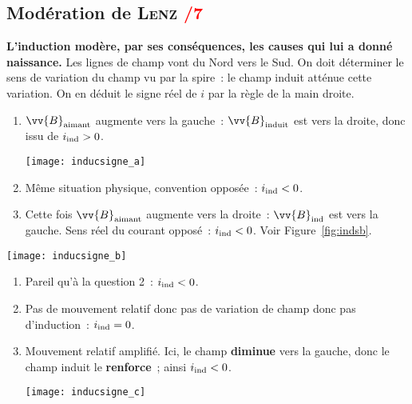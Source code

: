 \documentclass[11pt]{book}
\begin{document}
{	\subsection{Modération de \textsc{Lenz} \hfill \textcolor{red}{/7}}
	\label{ssec:lenz}
	\begin{enumerate}[start=5]
		 \textbf{L'induction modère, par ses conséquences, les causes qui
			lui a donné naissance.}
		 Les lignes de champ vont du Nord vers le Sud. On doit déterminer
		le sens de variation du champ vu par la spire~: le champ induit atténue
		cette variation. On en déduit le signe réel de $i$ par la règle de la main
		droite.
		\smallbreak
		\begin{minipage}[t]{.45\linewidth}
			\begin{enumerate}
				\item $\vv{B}_{\rm aimant}$ augmente vers la gauche~: $\vv{B}_{\rm
						      induit}$ est vers la droite, donc issu de $i_{\rm ind} > 0$.
				      \begin{center}
					      \texttt{[image: inducsigne\_a]}
					      \label{fig:indsa}
				      \end{center}
				\item Même situation physique, convention opposée~: $i_{\rm ind} < 0$.
				\item Cette fois $\vv{B}_{\rm aimant}$ augmente vers la droite~:
				      $\vv{B}_{\rm ind}$ est vers la gauche. Sens réel du courant opposé~:
				      $i_{\rm ind} < 0$. Voir Figure~\ref{fig:indsb}.
			\end{enumerate}
		\end{minipage}
		\hfill
		\begin{minipage}[t]{.45\linewidth}
			\begin{center}
				\texttt{[image: inducsigne\_b]}
				\label{fig:indsb}
			\end{center}
			\begin{enumerate}[start=4]
				\item Pareil qu'à la question 2~: $i_{\rm ind} < 0$.
				\item Pas de mouvement relatif donc pas de variation de champ donc pas
				      d'induction~: $i_{\rm ind} = 0$.
				\item Mouvement relatif amplifié. Ici, le champ \textbf{diminue} vers la
				      gauche, donc le champ induit le \textbf{renforce}~; ainsi $i_{\rm
							      ind} < 0$.
				      \begin{center}
					      \texttt{[image: inducsigne\_c]}
					      \label{fig:indsc}
				      \end{center}
			\end{enumerate}
		\end{minipage}
	\end{enumerate}
}
\end{document}
